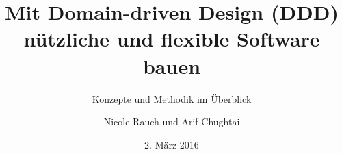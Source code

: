 \documentclass{beamer}
\author{Nicole Rauch und Arif Chughtai}
\title{Mit Domain-driven Design (DDD)\\ nützliche und flexible Software bauen}
\subtitle{Konzepte und Methodik im Überblick}
\date{2. März 2016}
\begin{document}
{
	\begin{frame}[t,plain]
		\titlepage
	\end{frame}
}

\end{document}
